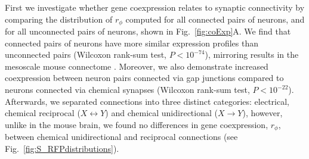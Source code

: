 \documentclass[10pt,letterpaper]{article}
\begin{document}
First we investigate whether gene coexpression relates to synaptic connectivity by comparing the distribution of $r_\phi$ computed for all connected pairs of neurons, and for all unconnected pairs of neurons, shown in Fig.~\ref{fig:coExp}A.
We find that connected pairs of neurons have more similar expression profiles than unconnected pairs (Wilcoxon rank-sum test, $P < 10^{-74}$), mirroring results in the mesoscale mouse connectome \cite{Fulcher:2016ck}.
Moreover, we also demonstrate increased coexpression between neuron pairs connected via gap junctions compared to neurons connected via chemical synapses (Wilcoxon rank-sum test, $P < 10^{-22}$).
Afterwards, we separated connections into three distinct categories: electrical, chemical reciprocal ($X \leftrightarrow Y$) and chemical unidirectional ($X \rightarrow Y$), however, unlike in the mouse brain, we found no differences in gene coexpression, $r_\phi$, between chemical unidirectional and reciprocal connections (see Fig.~\ref{fig:S_RFPdistributions}).
\end{document}
